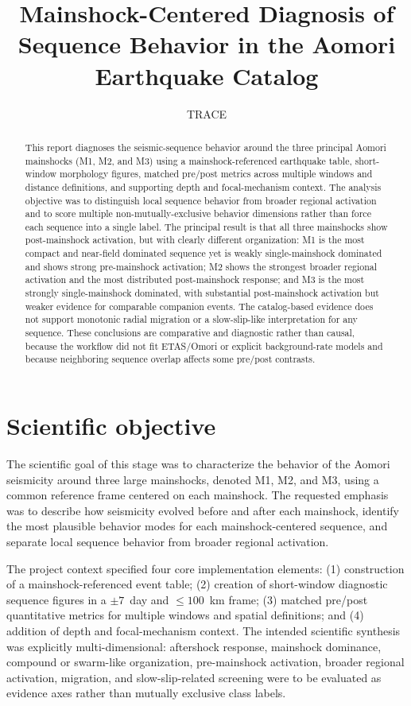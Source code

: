 \documentclass[11pt]{article}
\title{Mainshock-Centered Diagnosis of Sequence Behavior in the Aomori Earthquake Catalog}
\author{TRACE}
\date{}
\begin{document}
\maketitle

\begin{abstract}
This report diagnoses the seismic-sequence behavior around the three principal Aomori mainshocks (M1, M2, and M3) using a mainshock-referenced earthquake table, short-window morphology figures, matched pre/post metrics across multiple windows and distance definitions, and supporting depth and focal-mechanism context. The analysis objective was to distinguish local sequence behavior from broader regional activation and to score multiple non-mutually-exclusive behavior dimensions rather than force each sequence into a single label. The principal result is that all three mainshocks show post-mainshock activation, but with clearly different organization: M1 is the most compact and near-field dominated sequence yet is weakly single-mainshock dominated and shows strong pre-mainshock activation; M2 shows the strongest broader regional activation and the most distributed post-mainshock response; and M3 is the most strongly single-mainshock dominated, with substantial post-mainshock activation but weaker evidence for comparable companion events. The catalog-based evidence does not support monotonic radial migration or a slow-slip-like interpretation for any sequence. These conclusions are comparative and diagnostic rather than causal, because the workflow did not fit ETAS/Omori or explicit background-rate models and because neighboring sequence overlap affects some pre/post contrasts.
\end{abstract}

\section{Scientific objective}
The scientific goal of this stage was to characterize the behavior of the Aomori seismicity around three large mainshocks, denoted M1, M2, and M3, using a common reference frame centered on each mainshock. The requested emphasis was to describe how seismicity evolved before and after each mainshock, identify the most plausible behavior modes for each mainshock-centered sequence, and separate local sequence behavior from broader regional activation.

The project context specified four core implementation elements: (1) construction of a mainshock-referenced event table; (2) creation of short-window diagnostic sequence figures in a $\pm 7$~day and $\leq 100$~km frame; (3) matched pre/post quantitative metrics for multiple windows and spatial definitions; and (4) addition of depth and focal-mechanism context. The intended scientific synthesis was explicitly multi-dimensional: aftershock response, mainshock dominance, compound or swarm-like organization, pre-mainshock activation, broader regional activation, migration, and slow-slip-related screening were to be evaluated as evidence axes rather than mutually exclusive class labels.
\end{document}
